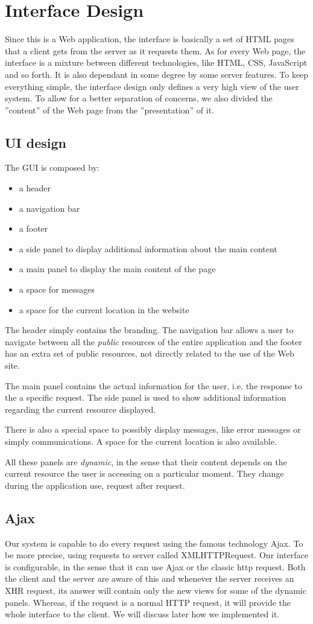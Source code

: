 \section{Interface Design}
Since this is a Web application, the interface is basically a set of HTML pages that a client gets from the server as it requests them. As for every Web page, the interface is a mixture between different technologies, like HTML, CSS, JavaScript and so forth. It is also dependant in some degree by some server features. To keep everything simple, the interface design only defines a very high view of the user system. To allow for a better separation of concerns, we also divided the ''content'' of the Web page from the ''presentation'' of it.
\subsection{UI design}
The GUI is composed by:
\begin{itemize}
\item a header
\item a navigation bar
\item a footer
\item a side panel to display additional information about the main content
\item a main panel to display the main content of the page
\item a space for messages
\item a space for the current location in the website
\end{itemize}
The header simply contains the branding. The navigation bar allows a user to navigate between all the \emph{public} resources of the entire application and the footer has an extra set of public resources, not directly related to the use of the Web site.

The main panel contains the actual information for the user, i.e. the response to the a specific request. The side panel is used to show additional information regarding the current resource displayed.

There is also a special space to possibly display messages, like error messages or simply communications. A space for the current location is also available.

All these panels are \emph{dynamic}, in the sense that their content depends on the current resource the user is accessing on a particular moment. They change during the application use, request after request.

\subsection{Ajax}
Our system is capable to do every request using the famous technology Ajax. To be more precise, using requests to server called XMLHTTPRequest. Our interface is configurable, in the sense that it can use Ajax or the classic http request. Both the client and the server are aware of this and whenever the server receives an XHR request, its answer will contain only the new views for some of the dynamic panels. Whereas, if the request is a normal HTTP request, it will provide the whole interface to the client. We will discuss later how we implemented it.

